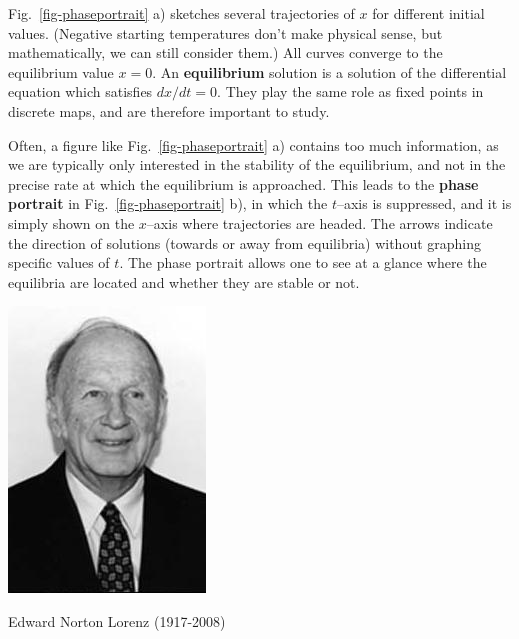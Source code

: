 Fig.~\ref{fig-phaseportrait} a) sketches several trajectories of $x$ for different initial values. (Negative starting temperatures don't make physical sense, but mathematically, we can still consider them.) All curves converge to the equilibrium value $x=0$. An \textbf{equilibrium} solution is a solution of the differential equation which satisfies $dx/dt = 0$. They play the same role as fixed points in discrete maps, and are therefore important to study.

Often, a figure like Fig.~\ref{fig-phaseportrait}  a) contains too much information, as we are typically only interested in the stability of the equilibrium, and not in the precise rate at which the equilibrium is approached. This leads to the \textbf{phase portrait} in Fig.~\ref{fig-phaseportrait} b), in which the $t$--axis is suppressed, and it is simply shown on the $x$--axis where trajectories are headed. The arrows indicate the direction of solutions (towards or away from equilibria) without graphing specific values of $t$. The phase portrait allows one to see at a glance where the equilibria are located and whether they are stable or not.

\pagebreak

\label{week12}

\begin{marginfigure}[0.0cm]
  \includegraphics{dynamic/figures/e_lorenz}
  \caption{Edward Norton Lorenz (1917-2008)}
\end{marginfigure}

